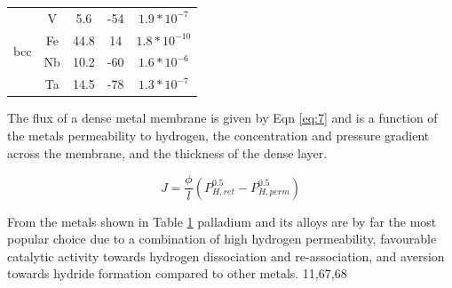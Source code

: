 \begin{table}[htbp]
{\begin{tabular}{@{}ccccc@{}}
    \multirow{4}{*}{bcc} & V                          & 5.6                                                                                              & -54                                                                              & $1.9*10^{-7}$                                                                                       \\
                         & Fe                         & 44.8                                                                                             & 14                                                                               & $1.8*10^{-10}$                                                                                      \\
                         & Nb                         & 10.2                                                                                             & -60                                                                              & $1.6*10^{-6}$                                                                                       \\
                         & Ta                         & 14.5                                                                                             & -78                                                                              & $1.3*10^{-7}$                                                                                       \\ \bottomrule
    \end{tabular}}\label{tb:2}
    \end{table}

The flux of a dense metal membrane is given by Eqn \ref{eq:7} and is a function of the metals 
permeability to hydrogen, the concentration and pressure gradient across the membrane, and 
the thickness of the dense layer. 

\begin{equation}\label{eq:7}
    J=\frac{\phi}{l} (P_{H,ret}^{0.5} - P_{H,perm}^{0.5})
\end{equation}

From the metals shown in Table \ref{tb:2} palladium and its alloys are by far the most 
popular choice due to a combination of high hydrogen permeability, favourable catalytic 
activity towards hydrogen dissociation and re-association, and aversion towards hydride 
formation compared to other metals. 11,67,68  

